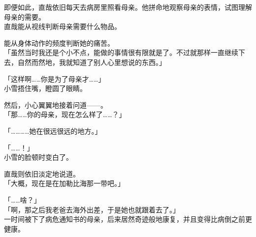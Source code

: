 即便如此，直哉依旧每天去病房里照看母亲。他拼命地观察母亲的表情，试图理解母亲的需要。\\

直哉能从视线判断母亲需要什么物品。

能从身体动作的频度判断她的痛苦。\\

「虽然当时我还是个小不点，能做的事情很有限就是了。不过就那样一直继续下去，自然而然地，我就知道了别人心里想说的东西。」

「这样啊……你是为了母亲才……」\\

小雪捂住嘴，瞪圆了眼睛。

然后，小心翼翼地接着问道——。\\

「那……你的母亲，现在怎么样了……？」

「…………她在很远很远的地方。」

「……！」\\

小雪的脸顿时变白了。

直哉则依旧淡定地说道。\\

「大概，现在是在加勒比海那一带吧。」

「……啥？」\\

「啊，那之后我老爸去海外出差，于是她也就跟着去了。」\\

一时间被下了病危通知书的母亲，后来居然奇迹般地康复，并且变得比病倒之前更健康。

